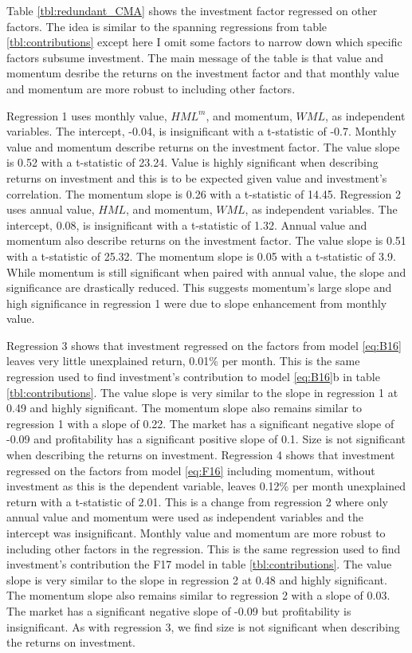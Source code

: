 
Table \ref{tbl:redundant_CMA} shows the investment factor regressed on other
factors.
The idea is similar to the spanning regressions from table
\ref{tbl:contributions} except here I omit some factors to narrow down which
specific factors subsume investment.
The main message of the table is that value and momentum desribe the returns on
the investment factor and that monthly value and momentum are more robust to
including other factors.

Regression 1 uses monthly value, $HML^m$, and momentum, $WML$, as independent
variables.
The intercept, -0.04, is insignificant with a t-statistic of -0.7.
Monthly value and momentum describe returns on the investment factor.
The value slope is 0.52 with a t-statistic of 23.24.
Value is highly significant when describing returns on investment and this is
to be expected given value and investment's correlation.
The momentum slope is 0.26 with a t-statistic of 14.45.
Regression 2 uses annual value, $HML$, and momentum, $WML$, as independent
variables.
The intercept, 0.08, is insignificant with a t-statistic of 1.32.
Annual value and momentum also describe returns on the investment factor.
The value slope is 0.51 with a t-statistic of 25.32.
The momentum slope is 0.05 with a t-statistic of 3.9.
While momentum is still significant when paired with annual value,
the slope and significance are drastically reduced.
This suggests momentum's large slope and high
significance
in regression 1 were due to slope enhancement from monthly value.

Regression 3 shows that investment regressed on the factors from
model \ref{eq:B16}
leaves very little unexplained return, 0.01\% per month.
This is the same regression used to find investment's contribution to
model \ref{eq:B16}b in table \ref{tbl:contributions}.
The value slope is very similar to the slope in regression 1 at 0.49 and highly
significant.
The momentum slope also remains similar to regression 1 with a slope of 0.22.
The market has a significant negative slope of -0.09 and
profitability has a significant positive slope of 0.1.
Size is not significant when describing the returns on investment.
Regression 4 shows that investment regressed on the factors from
model \ref{eq:F16} including momentum,
without investment as this is the dependent variable,
leaves 0.12\% per month unexplained return with a t-statistic of 2.01.
This is a change from regression 2 where only annual value and momentum were
used as independent variables and the intercept was insignificant.
Monthly value and momentum are more robust to including other factors in the
regression.
This is the same regression used to find investment's contribution the F17
model in table \ref{tbl:contributions}.
The value slope is very similar to the slope in regression 2 at 0.48 and highly
significant.
The momentum slope also remains similar to regression 2 with a slope of 0.03.
The market has a significant negative slope of -0.09 but
profitability is insignificant.
As with regression 3, we find size is not significant when describing the
returns on investment.

